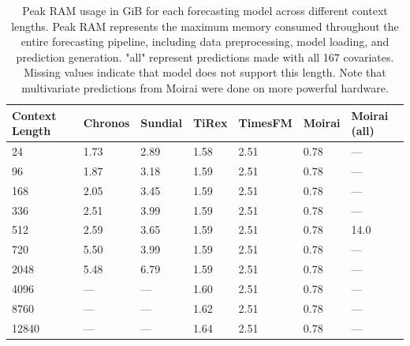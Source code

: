 \begin{table}[H]
\centering
\begin{tabular}{lllllll}
\toprule
\textbf{Context Length} &  \textbf{Chronos} &  \textbf{Sundial} &  \textbf{TiRex} &  \textbf{TimesFM} & \textbf{Moirai} & \textbf{Moirai (all)} \\
\midrule
24             & 1.73 & 2.89 & 1.58 & 2.51 & 0.78 & {---} \\
96             & 1.87 & 3.18 & 1.59 & 2.51 & 0.78 & {---} \\
168            & 2.05 & 3.45 & 1.59 & 2.51 & 0.78 & {---} \\
336            & 2.51 & 3.99 & 1.59 & 2.51 & 0.78 & {---} \\
512            & 2.59 & 3.65 & 1.59 & 2.51 & 0.78 & 14.0 \\
720            & 5.50 & 3.99 & 1.59 & 2.51 & 0.78 & {---} \\
2048           & 5.48 & 6.79 & 1.59 & 2.51 & 0.78 & {---} \\
4096           & {---} & {---} & 1.60 & 2.51 & 0.78 & {---} \\
8760           & {---} & {---} & 1.62 & 2.51 & 0.78 & {---} \\
12840          & {---} & {---} & 1.64 & 2.51 & 0.78 & {---} \\
\bottomrule
\end{tabular}
\caption{Peak RAM usage in GiB for each forecasting model across different context lengths. Peak RAM represents the maximum memory consumed throughout the entire forecasting pipeline, including data preprocessing, model loading, and prediction generation. "all" represent predictions made with all 167 covariates. Missing values indicate that model does not support this length. Note that multivariate predictions from Moirai were done on more powerful hardware.}
\label{tab:ram_context}
\end{table}
